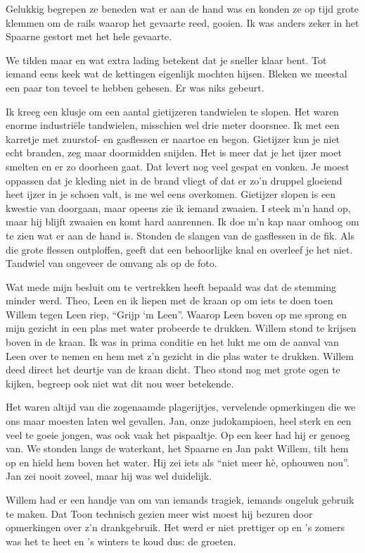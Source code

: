 \documentclass[10pt,twoside,openright]{memoir}
\begin{document}
Gelukkig begrepen ze beneden wat er aan de hand was en konden ze op tijd grote klemmen om de rails waarop het gevaarte reed, gooien. Ik was anders zeker in het Spaarne gestort met het hele gevaarte.

We tilden maar en wat extra lading betekent dat je sneller klaar bent. Tot iemand eens keek wat de kettingen eigenlijk mochten hijsen. Bleken we meestal een paar ton teveel te hebben gehesen. Er was niks gebeurt.

Ik kreeg een klusje om een aantal gietijzeren tandwielen te slopen. Het waren enorme industriële tandwielen, misschien wel drie meter doorsnee. Ik met een karretje met zuurstof- en gasflessen er naartoe en begon. Gietijzer kun je niet echt branden, zeg maar doormidden snijden. Het is meer dat je het ijzer moet smelten en er zo doorheen gaat. Dat levert nog veel gespat en vonken. Je moest oppassen dat je kleding niet in de brand vliegt of dat er zo’n druppel gloeiend heet ijzer in je schoen valt, is me wel eens overkomen. Gietijzer slopen is een kwestie van doorgaan, maar opeens zie ik iemand zwaaien. I steek m’n hand op, maar hij blijft zwaaien en komt hard aanrennen. Ik doe m’n kap naar omhoog om te zien wat er aan de hand is. Stonden de slangen van de gasflessen in de fik. Als die grote flessen ontploffen, geeft dat een behoorlijke knal en overleef je het niet. Tandwiel van ongeveer de omvang als op de foto.

Wat mede mijn besluit om te vertrekken heeft bepaald was dat de stemming minder werd. Theo, Leen en ik liepen met de kraan op om iets te doen toen Willem tegen Leen riep, ``Grijp ‘m Leen''. Waarop Leen boven op me sprong en mijn gezicht in een plas met water probeerde te drukken. Willem stond te krijsen boven in de kraan. Ik was in prima conditie en het lukt me om de aanval van Leen over te nemen en hem met z’n gezicht in die plas water te drukken. Willem deed direct het deurtje van de kraan dicht. Theo stond nog met grote ogen te kijken, begreep ook niet wat dit nou weer betekende.

Het waren altijd van die zogenaamde plagerijtjes, vervelende opmerkingen die we ons maar moesten laten wel gevallen. Jan, onze judokampioen, heel sterk en een veel te goeie jongen, was ook vaak het pispaaltje. Op een keer had hij er genoeg van. We stonden langs de waterkant, het Spaarne en Jan pakt Willem, tilt hem op en hield hem boven het water. Hij zei iets als ``niet meer hè, ophouwen nou''. Jan zei nooit zoveel, maar hij was wel duidelijk.

Willem had er een handje van om van iemands tragiek, iemands ongeluk gebruik te maken. Dat Toon technisch gezien meer wist moest hij bezuren door opmerkingen over z’n drankgebruik. Het werd er niet prettiger op en ’s zomers was het te heet en ’s winters te koud dus: de groeten.
\end{document}
